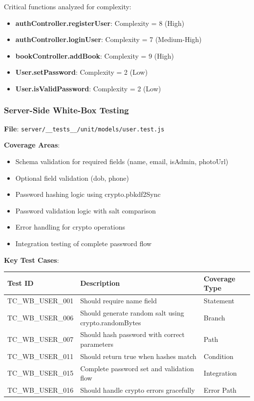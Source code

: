 Critical functions analyzed for complexity:
\begin{itemize}
    \item \textbf{authController.registerUser}: Complexity = 8 (High)
    \item \textbf{authController.loginUser}: Complexity = 7 (Medium-High)
    \item \textbf{bookController.addBook}: Complexity = 9 (High)
    \item \textbf{User.setPassword}: Complexity = 2 (Low)
    \item \textbf{User.isValidPassword}: Complexity = 2 (Low)
\end{itemize}

\subsubsection{Server-Side White-Box Testing}

\textbf{File}: \texttt{server/\_\_tests\_\_/unit/models/user.test.js}

\textbf{Coverage Areas}:
\begin{itemize}
    \item Schema validation for required fields (name, email, isAdmin, photoUrl)
    \item Optional field validation (dob, phone)
    \item Password hashing logic using crypto.pbkdf2Sync
    \item Password validation logic with salt comparison
    \item Error handling for crypto operations
    \item Integration testing of complete password flow
\end{itemize}

\textbf{Key Test Cases}:
\begin{longtable}{|>{\scriptsize}p{3cm}|p{6cm}|p{3cm}|}
\hline
\textbf{Test ID} & \textbf{Description} & \textbf{Coverage Type} \\
\hline
TC\_WB\_USER\_001 & Should require name field & Statement \\
\hline
TC\_WB\_USER\_006 & Should generate random salt using crypto.randomBytes & Branch \\
\hline
TC\_WB\_USER\_007 & Should hash password with correct parameters & Path \\
\hline
TC\_WB\_USER\_011 & Should return true when hashes match & Condition \\
\hline
TC\_WB\_USER\_015 & Complete password set and validation flow & Integration \\
\hline
TC\_WB\_USER\_016 & Should handle crypto errors gracefully & Error Path \\
\hline
\end{longtable}

